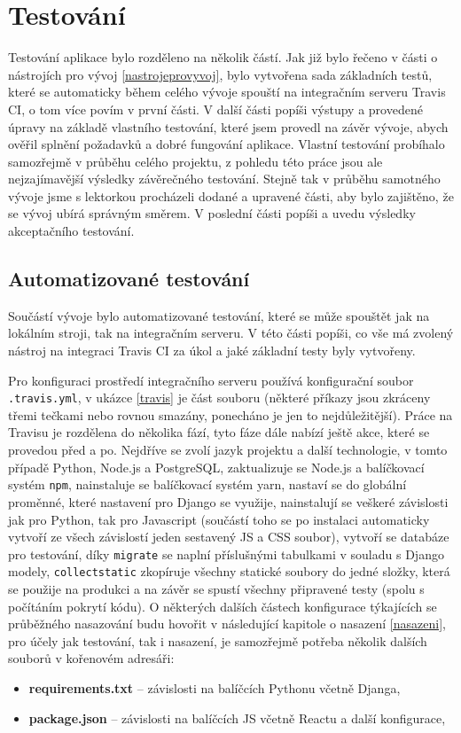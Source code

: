\chapter{Testování}\label{testovani}
    Testování aplikace bylo rozděleno na několik částí. Jak již bylo řečeno v části o nástrojích pro vývoj \ref{nastrojeprovyvoj}, bylo vytvořena sada základních testů, které se automaticky během celého vývoje spouští na integračním serveru Travis CI, o tom více povím v první části. V další části popíši výstupy a provedené úpravy na základě vlastního testování, které jsem provedl na závěr vývoje, abych ověřil splnění požadavků a dobré fungování aplikace. Vlastní testování probíhalo samozřejmě v průběhu celého projektu, z pohledu této práce jsou ale nejzajímavější výsledky závěrečného testování. Stejně tak v průběhu samotného vývoje jsme s lektorkou procházeli dodané a upravené části, aby bylo zajištěno, že se vývoj ubírá správným směrem. V poslední části popíši a uvedu výsledky akceptačního testování. 

    \section{Automatizované testování}
    Součástí vývoje bylo automatizované testování, které se může spouštět jak na lokálním stroji, tak na integračním serveru. V této části popíši, co vše má zvolený nástroj na integraci Travis CI za úkol a jaké základní testy byly vytvořeny.
    
    Pro konfiguraci prostředí integračního serveru používá konfigurační soubor \verb|.travis.yml|, v ukázce \ref{travis} je část souboru (některé příkazy jsou zkráceny třemi tečkami nebo rovnou smazány, ponecháno je jen to nejdůležitější). Práce na Travisu je rozdělena do několika fází, tyto fáze dále nabízí ještě akce, které se provedou před a po. Nejdříve se zvolí jazyk projektu a další technologie, v tomto případě Python, Node.js a PostgreSQL, zaktualizuje se Node.js a balíčkovací systém \verb|npm|, nainstaluje se balíčkovací systém yarn, nastaví se do globální proměnné, které nastavení pro Django se využije, nainstalují se veškeré závislosti jak pro Python, tak pro Javascript (součástí toho se po instalaci automaticky vytvoří ze všech závislostí jeden sestavený JS a CSS soubor), vytvoří se databáze pro testování, díky \verb|migrate| se naplní příslušnými tabulkami v souladu s Django modely, \verb|collectstatic| zkopíruje všechny statické soubory do jedné složky, která se použije na produkci a na závěr se spustí všechny připravené testy (spolu s počítáním pokrytí kódu). O některých dalších částech konfigurace týkajících se průběžného nasazování budu hovořit v následující kapitole o nasazení \ref{nasazeni}, pro účely jak testování, tak i nasazení, je samozřejmě potřeba několik dalších souborů v kořenovém adresáři:
    \begin{itemize}
        \item \textbf{requirements.txt} -- závislosti na balíčcích Pythonu včetně Djanga,
        \item \textbf{package.json} -- závislosti na balíčcích JS včetně Reactu a další konfigurace,
    \end{itemize}
    
